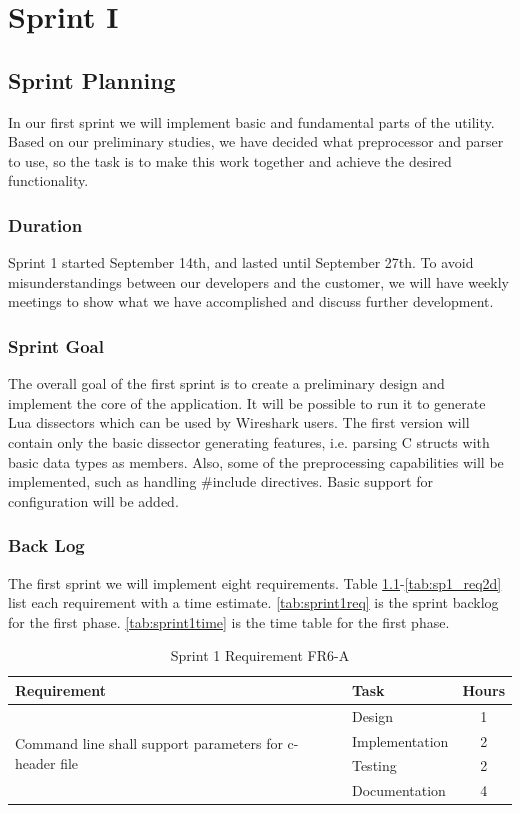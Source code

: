 \chapter{Sprint I}


\section{Sprint Planning}
In our first sprint we will implement basic and fundamental parts of the
utility. Based on our preliminary studies, we have decided what preprocessor
and parser to use, so the task is to make this work together and achieve the
desired functionality.  

\subsection{Duration}
Sprint 1 started September 14th, and lasted until September 27th. To avoid
misunderstandings between our developers and the customer, we will have weekly
meetings to show what we have accomplished and discuss further development. 

\subsection{Sprint Goal}
The overall goal of the first sprint is to create a preliminary design and
implement the core of the application. It will be possible to run it to
generate Lua dissectors which can be used by Wireshark users. The first
version will contain only the basic dissector generating features, i.e.
parsing C structs with basic data types as members. Also, some of the
preprocessing capabilities will be implemented, such as handling \#include
directives. Basic support for configuration will be added.

\subsection{Back Log}
The first sprint we will implement eight requirements. Table
\ref{tab:sp1_req7a}-\ref{tab:sp1_req2d}  list each requirement with a time
estimate. \autoref{tab:sprint1req} is the sprint backlog for the first phase.
\autoref{tab:sprint1time} is the time table for the first phase.

\begin{table}[!ht] \small \center
\caption{Sprint 1 Requirement FR6-A\label{tab:sp1_req7a}}
\begin{tabular}{l l c}
	\toprule
	Requirement & Task & Hours \\
	\midrule
	\multirow{4}{5cm}{Command line shall support parameters for c-header file} & Design & 1 \\
	& Implementation & 2 \\
	& Testing & 2 \\
	& Documentation & 4 \\
	\bottomrule
\end{tabular}
\end{table}

